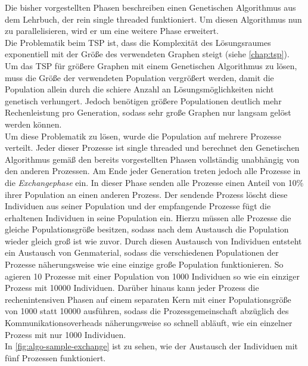 \documentclass[12pt,a4paper]{scrreprt}
\begin{document}
Die bisher vorgestellten Phasen beschreiben einen Genetischen Algorithmus aus dem Lehrbuch, der rein single threaded funktioniert. Um diesen Algorithmus nun zu parallelisieren, wird er um eine weitere Phase erweitert.\\
Die Problematik beim TSP ist, dass die Komplexität des Lösungsraumes exponentiell mit der Größe des verwendeten Graphen steigt (siehe \autoref{chap:tsp}). Um das TSP für größere Graphen mit einem Genetischen Algorithmus zu lösen, muss die Größe der verwendeten Population vergrößert werden, damit die Population allein durch die schiere Anzahl an Lösungsmöglichkeiten nicht genetisch verhungert. Jedoch benötigen größere Populationen deutlich mehr Rechenleistung pro Generation, sodass sehr große Graphen nur langsam gelöst werden können.\\
Um diese Problematik zu lösen, wurde die Population auf mehrere Prozesse verteilt. Jeder dieser Prozesse ist single threaded und berechnet den Genetischen Algorithmus gemäß den bereits vorgestellten Phasen vollständig unabhängig von den anderen Prozessen. Am Ende jeder Generation treten jedoch alle Prozesse in die \textit{Exchangephase} ein. In dieser Phase senden alle Prozesse einen Anteil von 10\% ihrer Population an einen anderen Prozess. Der sendende Prozess löscht diese Individuen aus seiner Population und der empfangende Prozesse fügt die erhaltenen Individuen in seine Population ein. Hierzu müssen alle Prozesse die gleiche Populationsgröße besitzen, sodass nach dem Austausch die Population wieder gleich groß ist wie zuvor. Durch diesen Austausch von Individuen entsteht ein Austausch von Genmaterial, sodass die verschiedenen Populationen der Prozesse näherungsweise wie eine einzige große Population funktionieren. So agieren 10 Prozesse mit einer Population von 1000 Individuen so wie ein einziger Prozess mit 10000 Individuen. Darüber hinaus kann jeder Prozess die rechenintensiven Phasen auf einem separaten Kern mit einer Populationsgröße von 1000 statt 10000 ausführen, sodass die Prozessgemeinschaft abzüglich des Kommunikationsoverheads näherungsweise so schnell abläuft, wie ein einzelner Prozess mit nur 1000 Individuen.\\
In \autoref{fig:algo-sample-exchange} ist zu sehen, wie der Austausch der Individuen mit fünf Prozessen funktioniert.
\end{document}
